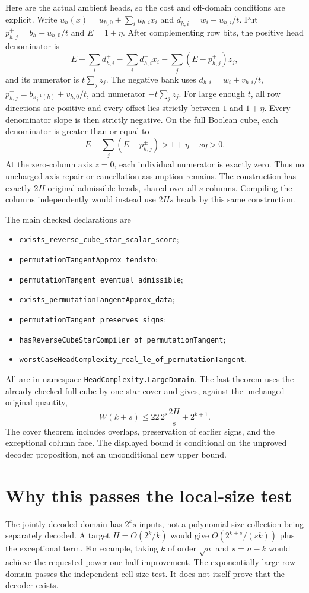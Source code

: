 \documentclass[11pt]{article}
\begin{document}
Here are the actual ambient heads, so the cost and off-domain conditions
are explicit. Write $u_h(x)=u_{h,0}+\sum_i u_{h,i}x_i$ and
$d^+_{h,i}=w_i+u_{h,i}/t$. Put
$p^+_{h,j}=b_h+u_{h,0}/t$ and $E=1+\eta$. After complementing row bits,
the positive head denominator is
\[
 E+\sum_i d^+_{h,i}-\sum_i d^+_{h,i}x_i
       -\sum_j(E-p^+_{h,j})z_j,
\]
and its numerator is $t\sum_jz_j$. The negative bank uses
$d^-_{h,i}=w_i+v_{h,i}/t$,
$p^-_{h,j}=b_{\pi_j^{-1}(h)}+v_{h,0}/t$, and numerator
$-t\sum_jz_j$.
For large enough $t$, all row directions are positive and every offset
lies strictly between $1$ and $1+\eta$. Every denominator slope is then
strictly negative. On the full Boolean cube, each denominator is greater
than or equal to
\[
 E-\sum_j(E-p^{\pm}_{h,j})>1+\eta-s\eta>0.
\]
At the zero-column axis $z=0$, each individual numerator is exactly zero.
Thus no uncharged axis repair or cancellation assumption remains.
The construction has exactly $2H$ original admissible heads, shared over
all $s$ columns. Compiling the columns independently would instead use
$2Hs$ heads by this same construction.

The main checked declarations are
\begin{itemize}
\item \texttt{exists\_reverse\_cube\_star\_scalar\_score};
\item \texttt{permutationTangentApprox\_tendsto};
\item \texttt{permutationTangent\_eventual\_admissible};
\item \texttt{exists\_permutationTangentApprox\_data};
\item \texttt{permutationTangent\_preserves\_signs};
\item \texttt{hasReverseCubeStarCompiler\_of\_permutationTangent};
\item \texttt{worstCaseHeadComplexity\_real\_le\_of\_permutationTangent}.
\end{itemize}
All are in namespace \texttt{HeadComplexity.LargeDomain}. The last theorem
uses the already checked full-cube by one-star cover and gives, against the
unchanged original quantity,
\[
 W(k+s)\leq 22\,2^s\frac{2H}{s}+2^{k+1}.
\]
The cover theorem includes overlaps, preservation of earlier signs, and
the exceptional column face. The displayed bound is conditional on the
unproved decoder proposition, not an unconditional new upper bound.

\section{Why this passes the local-size test}
The jointly decoded domain has $2^ks$ inputs, not a polynomial-size
collection being separately decoded. A target $H=O(2^k/k)$ would give
$O(2^{k+s}/(sk))$ plus the exceptional term. For example, taking
$k$ of order $\sqrt n$ and $s=n-k$ would achieve the requested power
one-half improvement. The exponentially large row domain passes the
independent-cell size test. It does not itself prove that the decoder exists.
\end{document}
